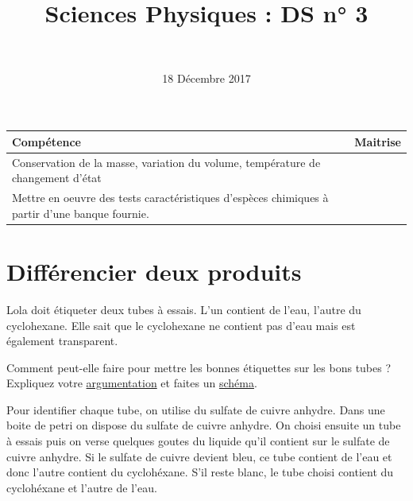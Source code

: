 \documentclass[a4paper,11pt]{exam}
\author{\ }
\date{18 Décembre 2017}
\title{Sciences Physiques : DS n° 3}
\begin{document}
%	

	\maketitle
	
	


\begin{small}
	\begin{center}
		\begin{tabular}{|@{\ }l@{}|@{\ }c@{\ }|}
			\hline
			\textbf{Compétence} & \textbf{Maitrise} \\
			\hline
			Conservation de la masse, variation du volume, température de changement d’état &  \ \ \ \\
			\hline
			Mettre en oeuvre des tests caractéristiques d’espèces chimiques à partir d’une banque fournie. &  \\
			\hline			
		\end{tabular}
	\end{center}
\end{small}	

\section{Différencier deux produits}

Lola doit étiqueter deux tubes à essais. L'un contient de l'eau, l'autre du cyclohexane. Elle sait que le cyclohexane ne contient pas d'eau mais est également transparent.

\begin{questions}
	\question Comment peut-elle faire pour mettre les bonnes étiquettes sur les bons tubes ? Expliquez votre \underline{argumentation} et faites un \underline{schéma}.
	
	\begin{solution}
		Pour identifier chaque tube, on utilise du sulfate de cuivre anhydre. Dans une boite de petri on dispose du sulfate de cuivre anhydre. On choisi ensuite un tube à essais puis on verse quelques goutes du liquide qu'il contient sur le sulfate de cuivre anhydre. Si le sulfate de cuivre devient bleu, ce tube contient de l'eau et donc l'autre contient du cyclohéxane. S'il reste blanc, le tube choisi contient du cyclohéxane et l'autre de l'eau.
	\end{solution}
\end{questions}
\end{document}
